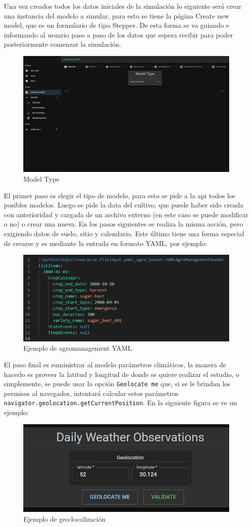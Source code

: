 Una vez creados todos los datos iniciales de la simulación lo siguiente será crear una instancia del modelo a simular, para esto se tiene la página Create new model, que es un formulario de tipo Stepper. De esta forma se va guiando e informando al usuario paso a paso de los datos que espera recibir para poder posteriormente comenzar la simulación.
\begin{figure}
	\centering
	\includegraphics[width=0.5\linewidth]{Images/stepper-1}
	\caption{Model Type}
	\label{fig:stepper-1}
\end{figure}
El primer paso es elegir el tipo de modelo, para esto se pide a la api todos los posibles modelos. Luego se pide la data del cultivo, que puede haber sido creada con anterioridad y cargada de un archivo externo (en este caso se puede modificar o no) o crear una nueva. En los pasos siguientes se realiza la misma acción, pero exigiendo datos de suelo, sitio y calendario. Este último tiene una forma especial de crearse y es mediante la entrada en formato YAML, por ejemplo:

\begin{figure}[!h]
	\centering
	\includegraphics[width=0.4\linewidth]{Images/yaml-agro-eg}
	\caption{Ejemplo de agromanagement YAML}
	\label{fig:yaml-agro-eg}
\end{figure}

El paso final es suministrar al modelo parámetros climáticos, la manera de hacerlo es proveer la latitud y longitud de donde se quiere realizar el estudio, o simplemente, se puede usar la opción \lstinline|Geolocate me| que, si se le brindan los permisos al navegador, intentará calcular estos parámetros \lstinline|navigator.geolocation.getCurrentPosition|. En la siguiente figura se ve un ejemplo:

\begin{figure}[!h]
	\centering
	\includegraphics[width=0.4\linewidth]{Images/dwp}
	\caption{Ejemplo de geo-localización}
	\label{fig:dwp}
\end{figure}

